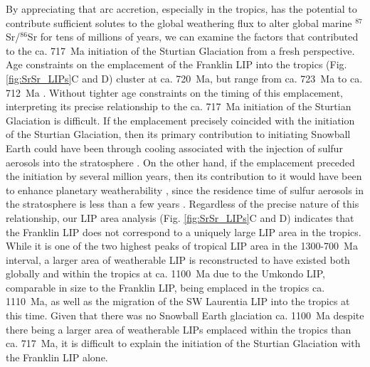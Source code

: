 \documentclass[11pt,letterpaper]{article}
\newcommand{\SrSr}{$^{87}$Sr/$^{86}$Sr\xspace}
\begin{document}
By appreciating that arc accretion, especially in the tropics, has the potential to contribute sufficient solutes to the global weathering flux to alter global marine \SrSr for tens of millions of years, we can examine the factors that contributed to the ca. 717~Ma initiation of the Sturtian Glaciation from a fresh perspective. Age constraints on the emplacement of the Franklin LIP into the tropics (Fig. \ref{fig:SrSr_LIPs}C and D) cluster at ca. 720~Ma, but range from ca. 723~Ma to ca. 712~Ma \citep{Heaman1992a, Pehrsson1999a, Denyszyn2009a}. Without tighter age constraints on the timing of this emplacement, interpreting its precise relationship to the ca. 717~Ma initiation of the Sturtian Glaciation is difficult. If the emplacement precisely coincided with the initiation of the Sturtian Glaciation, then its primary contribution to initiating Snowball Earth could have been through cooling associated with the injection of sulfur aerosols into the stratosphere \citep{Macdonald2017a}. On the other hand, if the emplacement preceded the initiation by several million years, then its contribution to it would have been to enhance planetary weatherability \citep{Godderis2003a, Rooney2014a, Cox2016a}, since the residence time of sulfur aerosols in the stratosphere is less than a few years \citep{McCormick1995a}. Regardless of the precise nature of this relationship, our LIP area analysis (Fig. \ref{fig:SrSr_LIPs}C and D) indicates that the Franklin LIP does not correspond to a uniquely large LIP area in the tropics. While it is one of the two highest peaks of tropical LIP area in the 1300-700~Ma interval, a larger area of weatherable LIP is reconstructed to have existed both globally and within the tropics at ca. 1100~Ma due to the Umkondo LIP, comparable in size to the Franklin LIP, being emplaced in the tropics ca. 1110~Ma, as well as the migration of the SW Laurentia LIP into the tropics at this time. Given that there was no Snowball Earth glaciation ca. 1100~Ma despite there being a larger area of weatherable LIPs emplaced within the tropics than ca. 717~Ma, it is difficult to explain the initiation of the Sturtian Glaciation with the Franklin LIP alone.
\end{document}
